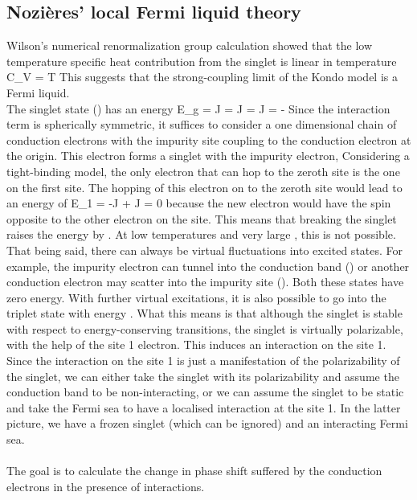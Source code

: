 \documentclass[14pt]{extarticle}
\numberwithin{equation}{section}
\begin{document}
{\subsection{Nozières' local Fermi liquid theory}
Wilson's numerical renormalization group calculation showed that the low temperature specific heat contribution from the singlet is linear in temperature
\beq
C_V = \gamma T
\eeq
This suggests that the strong-coupling limit of the Kondo model is a Fermi liquid.\\
The singlet state () has an energy
\beq
E_g = J = J = J = -
\eeq
Since the interaction term is spherically symmetric, it suffices to consider a one dimensional chain of conduction electrons with the impurity site coupling to the conduction electron at the origin.
This electron forms a singlet with the impurity electron,
\beq
{}
\eeq
Considering a tight-binding model, the only electron that can hop to the zeroth site is the one on the first site.
The hopping of this electron on to the zeroth site would lead to an energy of
\beq
E_1 = -J + J = 0
\eeq
because the new electron would have the spin opposite to the other electron on the  site.
This means that breaking the singlet raises the energy by .
At low temperatures and very large , this is not possible.
That being said, there can always be virtual fluctuations into excited states.
For example, the impurity electron can tunnel into the conduction band () or another conduction electron may scatter into the impurity site ().
Both these states have zero energy.
With further virtual excitations, it is also possible to go into the triplet state with energy .
What this means is that although the singlet is stable with respect to energy-conserving transitions, the singlet is virtually polarizable, with the help of the site 1 electron.
This induces an interaction on the site 1.
Since the interaction on the site 1 is just a manifestation of the polarizability of the singlet, we can either take the singlet with its polarizability and assume the conduction band to be non-interacting, or we can assume the singlet to be static and take the Fermi sea to have a localised interaction at the site 1.
In the latter picture, we have a frozen singlet (which can be ignored) and an interacting Fermi sea.\\\\
The goal is to calculate the change in phase shift suffered by the conduction electrons in the presence of interactions.
}
\end{document}
